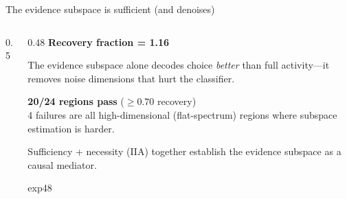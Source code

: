 \documentclass[aspectratio=169,11pt]{beamer}
\begin{document}
\begin{frame}{The evidence subspace is sufficient (and denoises)}
\begin{columns}[T]
\begin{column}{0.5\textwidth}
\end{column}
\begin{column}{0.48\textwidth}
\textbf{Recovery fraction = 1.16}

\vspace{0.5em}
The evidence subspace alone decodes choice \emph{better} than full activity---it removes noise dimensions that hurt the classifier.

\vspace{0.8em}
\textbf{20/24 regions pass} ($\geq 0.70$ recovery) \\
{\small 4 failures are all high-dimensional (flat-spectrum) regions where subspace estimation is harder.}

\vspace{0.8em}
Sufficiency + necessity (IIA) together establish the evidence subspace as a causal mediator.

\vspace{0.3em}
{\small exp48}
\end{column}
\end{columns}
\end{frame}

\end{document}
